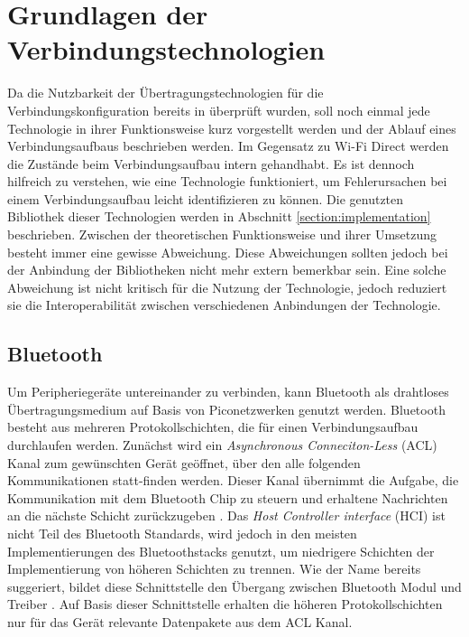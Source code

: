 \section{Grundlagen der Verbindungstechnologien}
	Da die Nutzbarkeit der Übertragungstechnologien für die Verbindungskonfiguration bereits in \cite{aiProject} überprüft wurden, soll noch einmal jede Technologie in ihrer Funktionsweise kurz vorgestellt werden und der Ablauf eines Verbindungsaufbaus beschrieben werden. Im Gegensatz zu Wi-Fi Direct werden die Zustände beim Verbindungsaufbau intern gehandhabt. Es ist dennoch hilfreich zu verstehen, wie eine Technologie funktioniert, um Fehlerursachen bei einem Verbindungsaufbau leicht identifizieren zu können. Die genutzten Bibliothek dieser Technologien werden in Abschnitt \ref{section:implementation} beschrieben. Zwischen der theoretischen Funktionsweise und ihrer Umsetzung besteht immer eine gewisse Abweichung. Diese Abweichungen sollten jedoch bei der Anbindung der Bibliotheken nicht mehr extern bemerkbar sein. Eine solche Abweichung ist nicht kritisch für die Nutzung der Technologie, jedoch reduziert sie die Interoperabilität zwischen verschiedenen Anbindungen der Technologie.
	
	\subsection{Bluetooth}
	Um Peripheriegeräte untereinander zu verbinden, kann Bluetooth als drahtloses Übertragungsmedium auf Basis von Piconetzwerken genutzt werden.
	Bluetooth besteht aus mehreren Protokollschichten, die für einen Verbindungsaufbau durchlaufen werden. Zunächst wird ein {\it Asynchronous Conneciton-Less} (ACL) Kanal zum gewünschten Gerät geöffnet, über den alle folgenden Kommunikationen statt-finden werden. Dieser Kanal übernimmt die Aufgabe, die Kommunikation mit dem Bluetooth Chip zu steuern und erhaltene Nachrichten an die nächste Schicht zurückzugeben \cite[S.400]{Sauter}. Das {\it Host Controller interface} (HCI) ist nicht Teil des Bluetooth Standards, wird jedoch in den meisten Implementierungen des Bluetoothstacks genutzt, um niedrigere Schichten der Implementierung von höheren Schichten zu trennen. Wie der Name bereits suggeriert, bildet diese Schnittstelle den Übergang zwischen Bluetooth Modul und Treiber \cite[S.65]{miller}. Auf Basis dieser Schnittstelle erhalten die höheren Protokollschichten nur für das Gerät relevante Datenpakete aus dem ACL Kanal.
	
